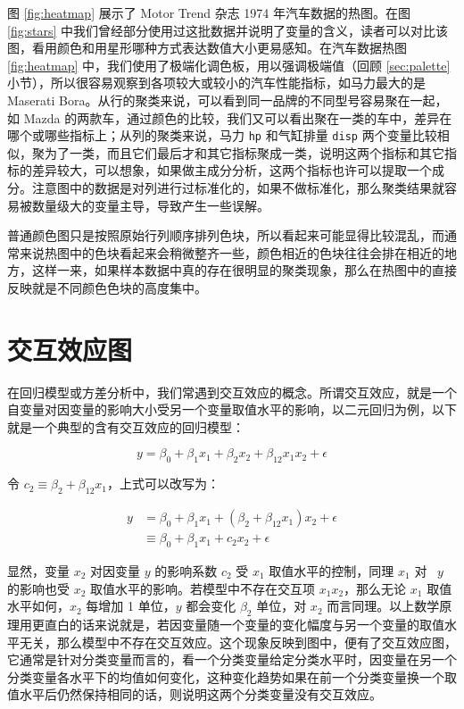 \documentclass[
  b5paper,
  UTF8,twoside]{book}
\begin{document}
图 \ref{fig:heatmap} 展示了 Motor Trend 杂志 1974 年汽车数据的热图。在图 \ref{fig:stars} 中我们曾经部分使用过这批数据并说明了变量的含义，读者可以对比该图，看用颜色和用星形哪种方式表达数值大小更易感知。在汽车数据热图 \ref{fig:heatmap} 中，我们使用了极端化调色板，用以强调极端值（回顾 \ref{sec:palette} 小节），所以很容易观察到各项较大或较小的汽车性能指标，如马力最大的是 Maserati Bora。从行的聚类来说，可以看到同一品牌的不同型号容易聚在一起，如 Mazda 的两款车，通过颜色的比较，我们又可以看出聚在一类的车中，差异在哪个或哪些指标上；从列的聚类来说，马力 \texttt{hp} 和气缸排量 \texttt{disp} 两个变量比较相似，聚为了一类，而且它们最后才和其它指标聚成一类，说明这两个指标和其它指标的差异较大，可以想象，如果做主成分分析，这两个指标也许可以提取一个成分。注意图中的数据是对列进行过标准化的，如果不做标准化，那么聚类结果就容易被数量级大的变量主导，导致产生一些误解。

普通颜色图只是按照原始行列顺序排列色块，所以看起来可能显得比较混乱，而通常来说热图中的色块看起来会稍微整齐一些，颜色相近的色块往往会排在相近的地方，这样一来，如果样本数据中真的存在很明显的聚类现象，那么在热图中的直接反映就是不同颜色色块的高度集中。

\section{交互效应图}\label{ux4ea4ux4e92ux6548ux5e94ux56fe}

在回归模型或方差分析中，我们常遇到交互效应的概念。所谓交互效应，就是一个自变量对因变量的影响大小受另一个变量取值水平的影响，以二元回归为例，以下就是一个典型的含有交互效应的回归模型：

\[y=\beta_{0}+\beta_{1}x_{1}+\beta_{2}x_{2}+\beta_{12}x_{1}x_{2}+\epsilon\]

令 \(c_{2}\equiv\beta_{2}+\beta_{12}x_{1}\)，上式可以改写为：

\[\begin{aligned}
y & =  \beta_{0}+\beta_{1}x_{1}+(\beta_{2}+\beta_{12}x_{1})x_{2}+\epsilon\\
 & \equiv  \beta_{0}+\beta_{1}x_{1}+c_{2}x_{2}+\epsilon\end{aligned}\]

显然，变量 \(x_{2}\) 对因变量 \(y\) 的影响系数 \(c_{2}\) 受 \(x_{1}\) 取值水平的控制，同理 \(x_{1}\) 对 ~\(y\) 的影响也受 \(x_{2}\) 取值水平的影响。若模型中不存在交互项 \(x_{1}x_{2}\)，那么无论 \(x_{1}\) 取值水平如何，\(x_{2}\) 每增加 1 单位，\(y\) 都会变化 \(\beta_{2}\) 单位，对 \(x_{2}\) 而言同理。以上数学原理用更直白的话来说就是，若因变量随一个变量的变化幅度与另一个变量的取值水平无关，那么模型中不存在交互效应。这个现象反映到图中，便有了交互效应图，它通常是针对分类变量而言的，看一个分类变量给定分类水平时，因变量在另一个分类变量各水平下的均值如何变化，这种变化趋势如果在前一个分类变量换一个取值水平后仍然保持相同的话，则说明这两个分类变量没有交互效应。
\end{document}
